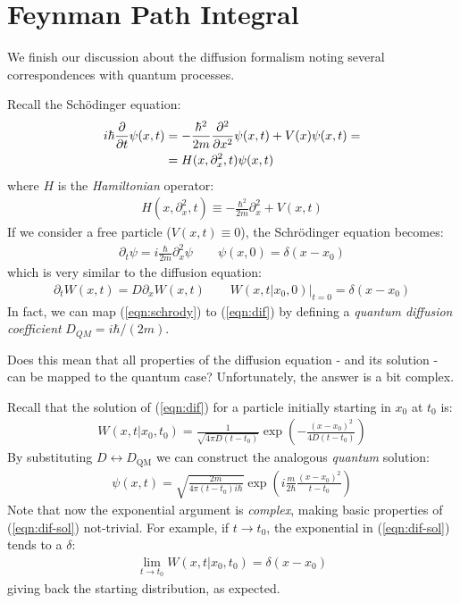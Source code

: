 \documentclass[../template.tex]{subfiles}
\begin{document}
\section{Feynman Path Integral}
We finish our discussion about the diffusion formalism noting several correspondences with quantum processes.

Recall the Sch\"odinger equation:
\begin{align*}
    i \hbar \pdv{t} \psi(x,t) &= - \frac{\hbar^2}{2 m} \pdv[2]{x} \psi(x,t) + V(x) \psi(x,t) =\\
    &= H(x, \partial_x^2,t) \psi(x,t)
\end{align*}
where $H$ is the \textit{Hamiltonian} operator:
\begin{align*}
    H(x, \partial_x^2,t) \equiv -\frac{\hbar^2}{2m} \partial_x^2 + V(x,t) 
\end{align*}  
If we consider a free particle ($V(x,t) \equiv 0$), the Schr\"odinger equation becomes:
\begin{align}
    \partial_t \psi = i \frac{\hbar}{2m} \partial_x^2 \psi  \qquad \psi(x,0) = \delta(x-x_0) \label{eqn:schrody}
\end{align}
which is very similar to the diffusion equation:
\begin{align}\label{eqn:dif}
    \partial_t W(x,t) = D\partial_x W(x,t) \qquad W(x,t|x_0,0) \Big|_{t=0} = \delta(x-x_0)
\end{align}
In fact, we can map (\ref{eqn:schrody}) to (\ref{eqn:dif}) by defining a \textit{quantum diffusion coefficient} $D_{QM} = i \hbar/(2m)$.

\medskip

Does this mean that all properties of the diffusion equation - and its solution - can be mapped to the quantum case? Unfortunately, the answer is a bit complex.

Recall that the solution of (\ref{eqn:dif}) for a particle initially starting in $x_0$ at $t_0$ is:
\begin{align} \label{eqn:dif-sol}
    W(x,t|x_0,t_0) = \frac{1}{\sqrt{4 \pi D (t-t_0)}} \exp\left(-\frac{(x - x_0)^2}{4 D (t-t_0)} \right) 
\end{align}
By substituting $D \leftrightarrow D_{\mathrm{QM}}$ we can construct the analogous \textit{quantum} solution:
\begin{align} \label{eqn:schrody-sol}
    \psi(x,t) = \sqrt{\frac{2m}{4 \pi (t-t_0)i \hbar} } \exp\left(i \frac{m}{2\hbar} \frac{(x-x_0)^2}{t-t_0}  \right) 
\end{align} 
Note that now the exponential argument is \textit{complex}, making basic properties of (\ref{eqn:dif-sol}) not-trivial. For example, if $t \to t_0$, the exponential in (\ref{eqn:dif-sol}) tends to a $\delta$:
\begin{align*}
    \lim_{t \to t_0} W(x,t|x_0,t_0) = \delta(x-x_0)
\end{align*}
giving back the starting distribution, as expected.
\end{document}

